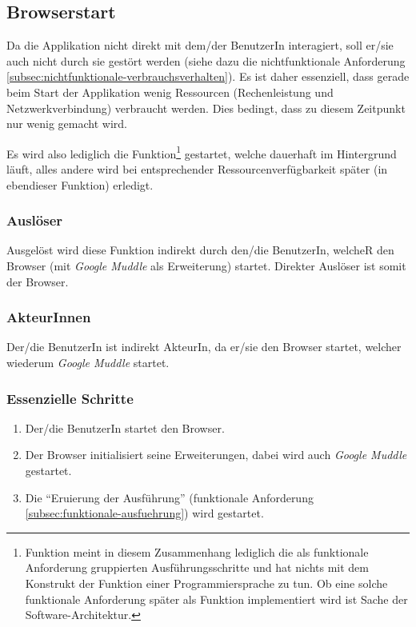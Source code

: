 \subsection{Browserstart}
\label{subsec:funktionale-start}

Da die Applikation nicht direkt mit dem/der BenutzerIn interagiert, soll er/sie
auch nicht durch sie gestört werden (siehe dazu die nichtfunktionale Anforderung
\ref{subsec:nichtfunktionale-verbrauchsverhalten}). Es ist daher essenziell,
dass gerade beim Start der Applikation wenig Ressourcen (Rechenleistung und
Netzwerkverbindung) verbraucht werden. Dies bedingt, dass zu diesem Zeitpunkt
nur wenig gemacht wird.

Es wird also lediglich die Funktion\footnote[1]{Funktion meint in diesem
Zusammenhang lediglich die als funktionale Anforderung gruppierten
Ausführungsschritte und hat nichts mit dem Konstrukt der Funktion einer
Programmiersprache zu tun. Ob eine solche funktionale Anforderung später als
Funktion implementiert wird ist Sache der Software-Architektur.} gestartet,
welche dauerhaft im Hintergrund läuft, alles andere wird bei entsprechender
Ressourcenverfügbarkeit später (in ebendieser Funktion) erledigt.

\subsubsection{Auslöser}

Ausgelöst wird diese Funktion indirekt durch den/die BenutzerIn, welcheR den
Browser (mit \textit{Google Muddle} als Erweiterung) startet. Direkter Auslöser
ist somit der Browser.

\subsubsection{AkteurInnen}

Der/die BenutzerIn ist indirekt AkteurIn, da er/sie den Browser startet, welcher
wiederum \textit{Google Muddle} startet.

\subsubsection{Essenzielle Schritte}

\begin{enumerate}
\item Der/die BenutzerIn startet den Browser.
\item Der Browser initialisiert seine Erweiterungen, dabei wird auch
\textit{Google Muddle} gestartet.
\item Die \enquote{Eruierung der Ausführung} (funktionale Anforderung
\ref{subsec:funktionale-ausfuehrung}) wird gestartet.
\end{enumerate}
